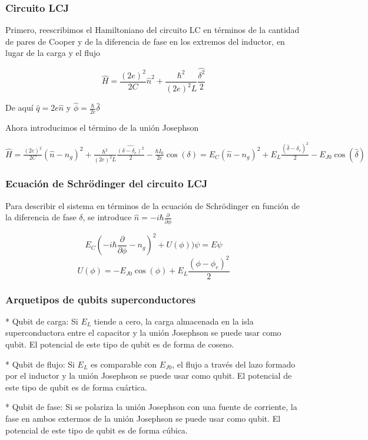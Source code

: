 \documentclass[xetex,mathserif,serif]{beamer}
\begin{document}
\begin{frame}
    \frametitle{Circuito LCJ}

\justify
Primero, reescribimos el Hamiltoniano del circuito LC en términos de la
cantidad de pares de Cooper y de la diferencia de fase en los extremos
del inductor, en lugar de la carga y el flujo

$$\hat{H} = \frac{(2e)^2}{2C} \hat{n}^2 + \frac{\hbar^2}{(2e)^2L} 
 \frac{\hat{\delta^2}}{2}$$

De aquí $\hat{q}=2e\hat{n}$ y $\hat{\phi}=\frac{\hbar}{2e}\hat{\delta}$

Ahora introducimos el término de la unión Josephson

$\hat{H} = \frac{(2e)^2}{2C} (\hat{n}-n_g)^2 + \frac{\hbar^2}{(2e)^2L} 
 \frac{\hat{(\delta-\delta_e)^2}}{2} - \frac{\hbar I_0}{2e} \cos(\delta)
 = E_C (\hat{n}-n_g)^2 + E_L \frac{(\hat{\delta}-\delta_e)^2}{2}
 - E_{J0} \cos(\hat{\delta})$

 \end{frame}
 
 \begin{frame}
     \frametitle{Ecuación de Schrödinger del circuito LCJ}

\justify
Para describir el sistema en términos de la ecuación de Schrödinger en
función de la diferencia de fase $\delta$, se introduce $\hat{n}=-i\hbar
\frac{\partial}{\partial \phi}$

$$E_C (-i\hbar \frac{\partial}{\partial\phi}-n_g)^2+U(\phi))\psi = E \psi$$
$$U(\phi) = -E_{J0} \cos(\phi)+E_L \frac{(\phi-\phi_e)^2}{2}$$

\end{frame}

\begin{frame}
    \frametitle{Arquetipos de qubits superconductores}

\justify
* Qubit de carga: Si $E_L$ tiende a cero, la carga almacenada en la isla 
    superconductora entre el capacitor y  la unión Josephson se puede usar 
    como qubit. El potencial de este tipo de qubit es de forma de coseno.

\justify
* Qubit de flujo: Si $E_L$ es comparable con $E_{J0}$, el flujo a través 
    del lazo formado por el inductor y la unión Josephson se puede usar como 
    qubit. El potencial de este tipo de qubit es de forma cuártica.

\justify
* Qubit de fase: Si se polariza la unión Josephson con una fuente de 
    corriente, la fase en ambos extermos de la unión Josephson se puede 
    usar como qubit. El potencial de este tipo de qubit es de forma cúbica.

\end{frame}
\end{document}
